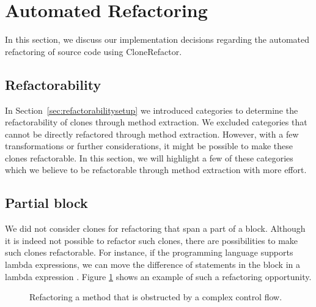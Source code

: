 \section{Automated Refactoring}
In this section, we discuss our implementation decisions regarding the automated refactoring of source code using CloneRefactor.

\subsection{Refactorability} \label{sec:discussrefactorability}
In Section~\ref{sec:refactorabilitysetup} we introduced categories to determine the refactorability of clones through method extraction. We excluded categories that cannot be directly refactored through method extraction. However, with a few transformations or further considerations, it might be possible to make these clones refactorable. In this section, we will highlight a few of these categories which we believe to be refactorable through method extraction with more effort.

\subsection{Partial block} \label{sec:partialblockdiscussion}
We did not consider clones for refactoring that span a part of a block. Although it is indeed not possible to refactor such clones, there are possibilities to make such clones refactorable. For instance, if the programming language supports lambda expressions, we can move the difference of statements in the block in a lambda expression \cite{tsantalis2017clone}. Figure \ref{fig:partialblockrefactoring} shows an example of such a refactoring opportunity.

\begin{figure}[H]
\begin{parcolumns}{2}
\end{parcolumns}
\caption{Refactoring a method that is obstructed by a complex control flow.}
\label{fig:partialblockrefactoring}
\end{figure}

